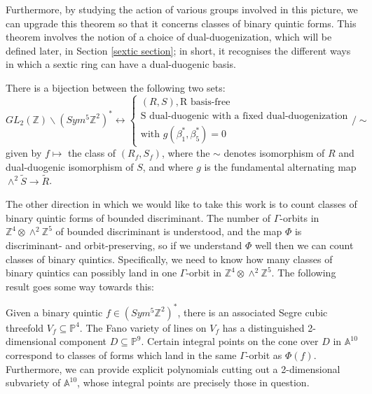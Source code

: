 \documentclass{article}
\begin{document}
Furthermore, by studying the action of various groups involved in this picture, we can upgrade this theorem so that it concerns classes of binary quintic forms.  This theorem involves the notion of a choice of dual-duogenization, which will be defined later, in Section \ref{sextic section}; in short, it recognises the different ways in which a sextic ring can have a dual-duogenic basis.
\begin{theorem}
There is a bijection between the following two sets:
\begin{equation}
GL_2(\mathbb{Z}) \backslash 
(Sym^5 \mathbb{Z}^2)^* \leftrightarrow
\begin{cases}
(R,S), \text{R basis-free} \\
\text{S dual-duogenic with a fixed dual-duogenization} \\
\text{with } g(\beta_1^*,\beta_5^*) = 0 
\end{cases}
 / \sim
\end{equation}
given by $f \mapsto$ the class of $(R_f, S_f)$, where the $\sim$ denotes isomorphism of $R$ and dual-duogenic isomorphism of $S$, and where $g$ is the fundamental alternating map $\wedge^2 \tilde{S} \to \tilde{R}$.
\end{theorem}

The other direction in which we would like to take this work is to count classes of binary quintic forms of bounded discriminant.  The number of $\Gamma$-orbits in $\mathbb{Z}^4 \otimes \wedge^2 \mathbb{Z}^5$ of bounded discriminant is understood, and the map $\Phi$ is discriminant- and orbit-preserving, so if we understand $\Phi$ well then we can count classes of binary quintics.  Specifically, we need to know how many classes of binary quintics can possibly land in one $\Gamma$-orbit in $\mathbb{Z}^4 \otimes \wedge^2 \mathbb{Z}^5$.  The following result goes some way towards this:

\begin{theorem} [In Progress]
Given a binary quintic $f \in (Sym^5 \mathbb{Z}^2)^*$, there is an associated Segre cubic threefold $V_f \subseteq \mathbb{P}^4$.  The Fano variety of lines on $V_f$ has a distinguished 2-dimensional component $D \subseteq \mathbb{P}^9$.  Certain integral points on the cone over $D$ in $\mathbb{A}^{10}$ correspond to classes of forms which land in the same $\Gamma$-orbit as $\Phi(f)$.  Furthermore, we can provide explicit polynomials cutting out a 2-dimensional subvariety of $\mathbb{A}^{10}$, whose integral points are precisely those in question.
\end{theorem}
\end{document}
